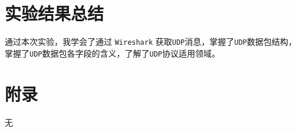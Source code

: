 \documentclass{article}
\begin{document}
\section{实验结果总结}

通过本次实验，我学会了通过 \texttt{Wireshark} 获取\texttt{UDP}消息，掌握了\texttt{UDP}数据包结构，掌握了\texttt{UDP}数据包各字段的含义，了解了\texttt{UDP}协议适用领域。

\section{附录}

无
\end{document}
